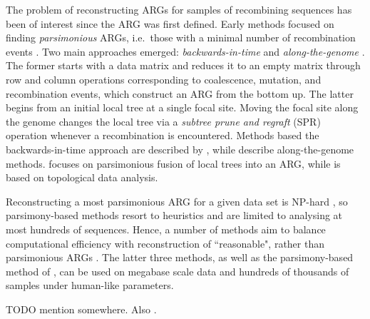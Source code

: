 \documentclass{article}
\begin{document}
The problem of reconstructing ARGs for samples of recombining sequences has
been of interest since the ARG was first defined. Early methods focused on
finding \emph{parsimonious} ARGs, i.e.\ those with a minimal number of
recombination events \citep{hein1990reconstructing}. Two main approaches
emerged: \emph{backwards-in-time} \citep{lyngso2005minimum} and
\emph{along-the-genome} \citep{song2003parsimonious, song2005constructing}. The
former starts with a data matrix and reduces it to an empty matrix through row
and column operations corresponding to coalescence, mutation, and recombination
events, which construct an ARG from the bottom up. The latter begins from an
initial local tree at a single focal site. Moving the focal site along the
genome changes the local tree via a \emph{subtree prune and regraft} (SPR)
operation whenever a recombination is encountered. Methods based the
backwards-in-time approach are described by \citet{song2005efficient,
wu2008association, thao2019hybrid, ignatieva2021kwarg}, while
\citet{hein1993heuristic, wu2011new, mirzaei2017rent} describe along-the-genome
methods. \citet{rasmussen2022espalier} focuses on parsimonious fusion of local
trees into an ARG, while \citet{camara2016inference} is based on topological
data analysis.

Reconstructing a most parsimonious ARG for a given data set is NP-hard
\citep{wang2001perfect}, so parsimony-based methods resort to heuristics and
are limited to analysing at most hundreds of sequences. Hence, a number of
methods aim to balance computational efficiency with reconstruction of
``reasonable", rather than parsimonious ARGs \citep{minichiello2006mapping,
parida2008estimating, kelleher2019inferring,  speidel2019method,
zhang2021biobank}. The latter three methods, as well as the parsimony-based
method of \citet{rasmussen2022espalier}, can be used on megabase scale data and
hundreds of thousands of samples under human-like parameters.

TODO mention \citep{schaefer2021ancestral} somewhere.
Also \citep{kuhner2017consensus}.

\end{document}
